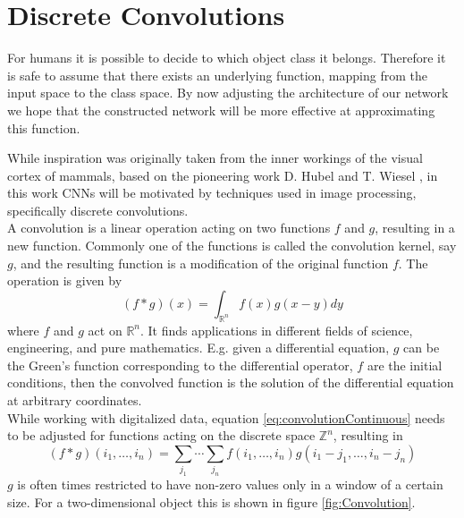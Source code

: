 \section{Discrete Convolutions}\label{sec:DiscreteConvolutions}
For humans it is possible to decide to which object class it belongs. Therefore it is safe to assume that there exists an underlying function, mapping from the input space to the class space. By now adjusting the architecture of our network we hope that the constructed network will be more effective at approximating this function. 

While inspiration was originally taken from the inner workings of the visual cortex of mammals, based on the pioneering work D. Hubel and T. Wiesel \cite{Hubel1959}, in this work CNNs will be motivated by techniques used in image processing, specifically discrete convolutions. \\


A convolution is a linear operation acting on two functions $f$ and $g$, resulting in a new function. Commonly one of the functions is called the convolution kernel, say $g$, and the resulting function is a modification of the original function $f$. The operation is given by
\begin{equation} \label{eq:convolutionContinuous}
(f*g)(x) = \int_{\mathbb{R}^n} f(x)g(x-y)dy
\end{equation}
where $f$ and $g$ act on $\mathbb{R}^n$. It finds applications in different fields of science, engineering, and pure mathematics. E.g. given a differential equation, $g$ can be the Green's function corresponding to the differential operator, $f$ are the initial conditions, then the convolved function is the solution of the differential equation at arbitrary coordinates. \\

While working with digitalized data, equation \ref{eq:convolutionContinuous} needs to be adjusted for functions acting on the discrete space $\mathbb{Z}^n$, resulting in
\begin{equation}\label{eq:convolutionDiscrete}
(f*g)(i_1,\dots ,i_n) = \sum_{j_1} \cdots \sum_{j_n} f(i_1,\dots ,i_n) g(i_1-j_1,\dots ,i_n-j_n)
\end{equation}
$g$ is often times restricted to have non-zero values only in a window of a certain size. For a two-dimensional object this is shown in figure \ref{fig:Convolution}. \\

